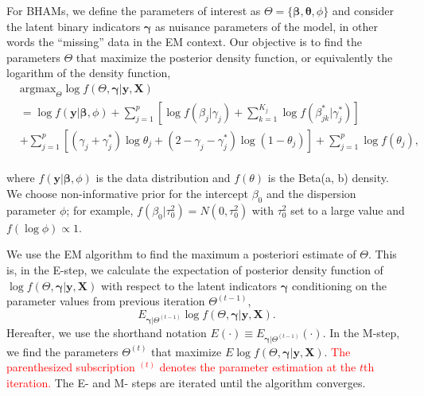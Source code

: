 \documentclass[AMA,STIX1COL,]{WileyNJD-v2}
\begin{document}
For BHAMs, we define the parameters of interest as
\(\Theta = \{\boldsymbol{\beta}, \boldsymbol{\theta}, \phi\}\) and
consider the latent binary indicators \(\boldsymbol{\gamma}\) as
nuisance parameters of the model, in other words the ``missing'' data in
the EM context. Our objective is to find the parameters \(\Theta\) that
maximize the posterior density function, or equivalently the logarithm
of the density function, \[
\begin{aligned}
& \text{argmax}_{\Theta}
\log f(\Theta, \boldsymbol{\gamma}| \textbf{y}, \textbf{X}) \\
&= \log f(\textbf{y}|\boldsymbol{\beta}, \phi) + \sum\limits_{j=1}^p\left[\log f(\beta_j|\gamma_j)+\sum\limits_{k=1}^{K_j} \log f(\beta^{*}_{jk}|\gamma^{*}_{j})\right]\\
& +\sum\limits_{j=1}^{p} \left[ (\gamma_j+\gamma_{j}^{*})\log \theta_j + (2-\gamma_j-\gamma_{j}^{*}) \log (1-\theta_j)\right] +  \sum\limits_{j=1}^{p}\log f(\theta_j),
\end{aligned}
\]\\
where \(f(\textbf{y}|\boldsymbol{\beta}, \phi)\) is the data
distribution and \(f(\theta)\) is the Beta(a, b) density. We choose
non-informative prior for the intercept \(\beta_0\) and the dispersion
parameter \(\phi\); for example, \(f(\beta_0|\tau_0^2)=N(0,\tau_0^2)\)
with \(\tau^2_0\) set to a large value and \(f(\log \phi) \propto 1\).

We use the EM algorithm to find the maximum a posteriori estimate of
\(\Theta\). This is, in the E-step, we calculate the expectation of
posterior density function of
\(\log f(\Theta, \boldsymbol{\gamma}| \textbf{y}, \textbf{X})\) with
respect to the latent indicators \(\boldsymbol{\gamma}\) conditioning on
the parameter values from previous iteration \(\Theta^{(t-1)}\), \[
E_{\boldsymbol{\gamma}|\Theta^{(t-1)}}\log f(\Theta, \boldsymbol{\gamma}| \textbf{y}, \textbf{X}) .
\] Hereafter, we use the shorthand notation
\(E(\cdot)\equiv E_{\boldsymbol{\gamma}|\Theta^{(t-1)}}(\cdot)\). In the
M-step, we find the parameters \(\Theta^{(t)}\) that maximize
\(E\log f(\Theta, \boldsymbol{\gamma}| \textbf{y}, \textbf{X})\).
\textcolor{red}{The parenthesized subscription $^{(t)}$ denotes the parameter estimation at the $t$th iteration.}
The E- and M- steps are iterated until the algorithm converges.
\end{document}
